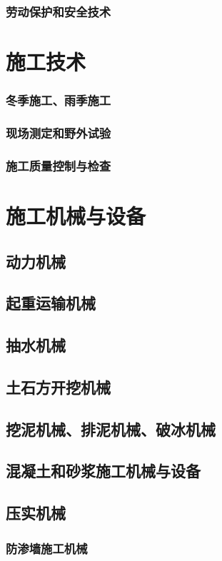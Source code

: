 \documentclass[UTF8]{../../ApplicationUniverse}
\begin{document}
    \subsubsection{劳动保护和安全技术}
\section{施工技术}
    \subsubsection{冬季施工、雨季施工}
    \subsubsection{现场测定和野外试验}
    \subsubsection{施工质量控制与检查}
\section{施工机械与设备}
    \subsection{动力机械}
    \subsection{起重运输机械}
    \subsection{抽水机械}
    \subsection{土石方开挖机械}
    \subsection{挖泥机械、排泥机械、破冰机械}
    \subsection{混凝土和砂浆施工机械与设备}
    \subsection{压实机械}
        \subsubsection{防渗墙施工机械}
\end{document}
